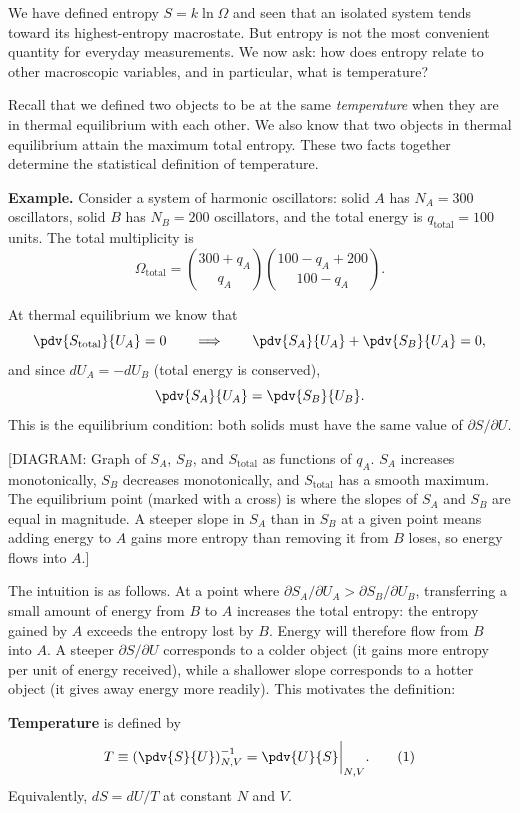 We have defined entropy $S = k\ln\Omega$ and seen that an isolated system tends toward its
highest-entropy macrostate. But entropy is not the most convenient quantity for everyday
measurements. We now ask: how does entropy relate to other macroscopic variables, and in
particular, what is temperature?

Recall that we defined two objects to be at the same \emph{temperature} when they are in
thermal equilibrium with each other. We also know that two objects in thermal equilibrium
attain the maximum total entropy. These two facts together determine the statistical definition
of temperature.

\textbf{Example.} Consider a system of harmonic oscillators: solid $A$ has $N_A = 300$
oscillators, solid $B$ has $N_B = 200$ oscillators, and the total energy is $q_{\text{total}} =
100$ units. The total multiplicity is
\[
  \Omega_{\text{total}} = \binom{300 + q_A}{q_A}\binom{100 - q_A + 200}{100 - q_A}.
\]

At thermal equilibrium we know that
\[
  \pdv{S_{\text{total}}}{U_A} = 0
  \qquad\Longrightarrow\qquad
  \pdv{S_A}{U_A} + \pdv{S_B}{U_A} = 0,
\]
and since $dU_A = -dU_B$ (total energy is conserved),
\[
  \pdv{S_A}{U_A} = \pdv{S_B}{U_B}.
\]
This is the equilibrium condition: both solids must have the same value of $\partial S/\partial U$.

\begin{center}
[DIAGRAM: Graph of $S_A$, $S_B$, and $S_{\text{total}}$ as functions of $q_A$. $S_A$ increases
monotonically, $S_B$ decreases monotonically, and $S_{\text{total}}$ has a smooth maximum. The
equilibrium point (marked with a cross) is where the slopes of $S_A$ and $S_B$ are equal in
magnitude. A steeper slope in $S_A$ than in $S_B$ at a given point means adding energy to $A$
gains more entropy than removing it from $B$ loses, so energy flows into $A$.]
\end{center}

The intuition is as follows. At a point where $\partial S_A/\partial U_A > \partial S_B/\partial
U_B$, transferring a small amount of energy from $B$ to $A$ increases the total entropy: the
entropy gained by $A$ exceeds the entropy lost by $B$. Energy will therefore flow from $B$ into
$A$. A steeper $\partial S/\partial U$ corresponds to a colder object (it gains more entropy per
unit of energy received), while a shallower slope corresponds to a hotter object (it gives away
energy more readily). This motivates the definition:

\begin{definition}
\textbf{Temperature} is defined by
\begin{equation}
  T \equiv \left(\pdv{S}{U}\right)_{N,V}^{-1} = \pdv{U}{S}\bigg|_{N,V}. \tag{1}
\end{equation}
Equivalently, $dS = dU/T$ at constant $N$ and $V$.
\end{definition}

